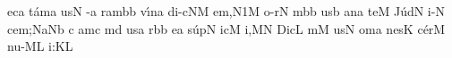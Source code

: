 \bigskip

\initiumgregorianum
{}%
ec\punctum a\egn
\sgn t{\'a}m\punctum a\egn
\sgn {}us\punctum N\egn
\spatium
{}-\punctum a\egn
\sgn ram\bmolle b\punctum b\egn
\spatium
\sgn v{\'\i}n\punctum a\egn
\sgn di{-c}\clivis NM\egn
\sgn {}e{m,}\episem N1\punctum M\egn
\spatium
\divisiominima
\spatium
{}o{-r}\punctum N\egn
{}m\bmolle b\punctum b\egn
\sgn {}us\punctum b\egn
\spatium
\sgn {}an\punctum a\egn
\sgn te{}\punctum M\egn
\spatium
\sgn J{\'u}d\punctum N\egn
\sgn {}i-\punctum N\egn
\sgn ce{m;}\pes Na\augmentumduplex Nb\egn
\spatium
\divisiominor
\spatium
\custos c
\lineaproxima
{}am\punctum c\egn
{}m\punctum d\egn
\sgn {}us\punctum a\egn
\spatium
{}r\engl{ }\bmolle b\punctum b\egn
\sgn {}e{}\punctum a\egn
\spatium
\sgn s{\'u}p\punctum N\egn
{}ic\punctum M\egn
\sgn {}i,\punctum M\augmentum N\egn
\spatium
\divisiominima
\spatium
\sgn Dic\punctum L\egn
{}m\punctum M\egn
\sgn {}us\punctum N\egn
\spatium
\sgn { }om\punctum a\egn
\sgn nes\punctum K\egn
\spatium
\sgn c{\'e}r\punctum M\egn
\sgn nu-\clivis ML\egn
\sgn {}i:\punctum K\augmentum L\egn
\spatium
\Finisgregoriana

\bigskip

\beginlyrics

